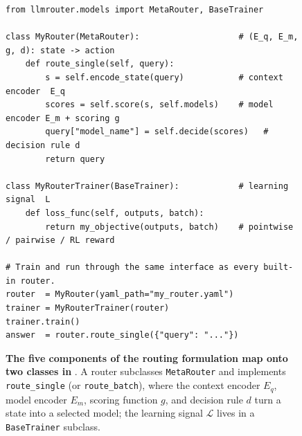 
\begin{figure}[t]
\centering
\begin{lstlisting}[style=llmrouter]
from llmrouter.models import MetaRouter, BaseTrainer

class MyRouter(MetaRouter):                    # (E_q, E_m, g, d): state -> action
    def route_single(self, query):
        s = self.encode_state(query)           # context encoder  E_q
        scores = self.score(s, self.models)    # model encoder E_m + scoring g
        query["model_name"] = self.decide(scores)   # decision rule d
        return query

class MyRouterTrainer(BaseTrainer):            # learning signal  L
    def loss_func(self, outputs, batch):
        return my_objective(outputs, batch)    # pointwise / pairwise / RL reward

# Train and run through the same interface as every built-in router.
router  = MyRouter(yaml_path="my_router.yaml")
trainer = MyRouterTrainer(router)
trainer.train()
answer  = router.route_single({"query": "..."})
\end{lstlisting}
\caption{\textbf{The five components of the routing formulation map onto two classes in \method}. A router subclasses \texttt{MetaRouter} and implements \texttt{route\_single} (or \texttt{route\_batch}), where the context encoder $E_q$, model encoder $E_m$, scoring function $g$, and decision rule $d$ turn a state into a selected model; the learning signal $\mathcal{L}$ lives in a \texttt{BaseTrainer} subclass. }
\label{fig:code}
\vspace{-10pt}
\end{figure}
